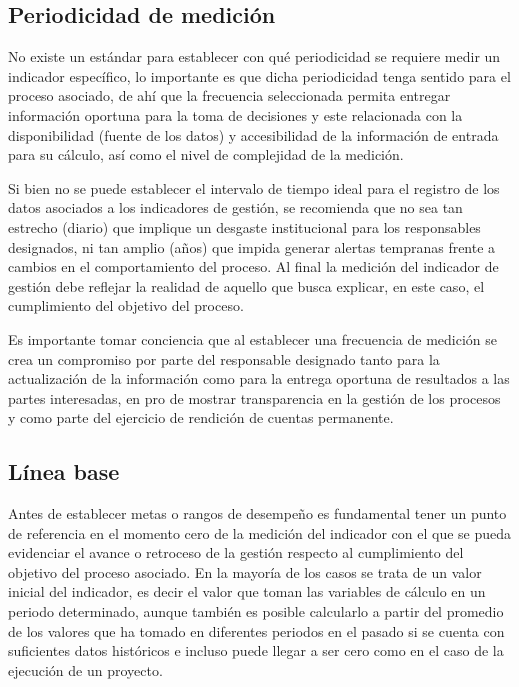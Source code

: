 \documentclass[
]{book}
\begin{document}
\hypertarget{periodicidad-de-mediciuxf3n}{%
\subsection{Periodicidad de medición}\label{periodicidad-de-mediciuxf3n}}

No existe un estándar para establecer con qué periodicidad se requiere medir un indicador específico, lo importante es que dicha periodicidad tenga sentido para el proceso asociado, de ahí que la frecuencia seleccionada permita entregar información oportuna para la toma de decisiones y este relacionada con la disponibilidad (fuente de los datos) y accesibilidad de la información de entrada para su cálculo, así como el nivel de complejidad de la medición.

Si bien no se puede establecer el intervalo de tiempo ideal para el registro de los datos asociados a los indicadores de gestión, se recomienda que no sea tan estrecho (diario) que implique un desgaste institucional para los responsables designados, ni tan amplio (años) que impida generar alertas tempranas frente a cambios en el comportamiento del proceso. Al final la medición del indicador de gestión debe reflejar la realidad de aquello que busca explicar, en este caso, el cumplimiento del objetivo del proceso.

Es importante tomar conciencia que al establecer una frecuencia de medición se crea un compromiso por parte del responsable designado tanto para la actualización de la información como para la entrega oportuna de resultados a las partes interesadas, en pro de mostrar transparencia en la gestión de los procesos y como parte del ejercicio de rendición de cuentas permanente.

\hypertarget{luxednea-base}{%
\subsection{Línea base}\label{luxednea-base}}

Antes de establecer metas o rangos de desempeño es fundamental tener un punto de referencia en el momento cero de la medición del indicador con el que se pueda evidenciar el avance o retroceso de la gestión respecto al cumplimiento del objetivo del proceso asociado. En la mayoría de los casos se trata de un valor inicial del indicador, es decir el valor que toman las variables de cálculo en un periodo determinado, aunque también es posible calcularlo a partir del promedio de los valores que ha tomado en diferentes periodos en el pasado si se cuenta con suficientes datos históricos e incluso puede llegar a ser cero como en el caso de la ejecución de un proyecto.
\end{document}
